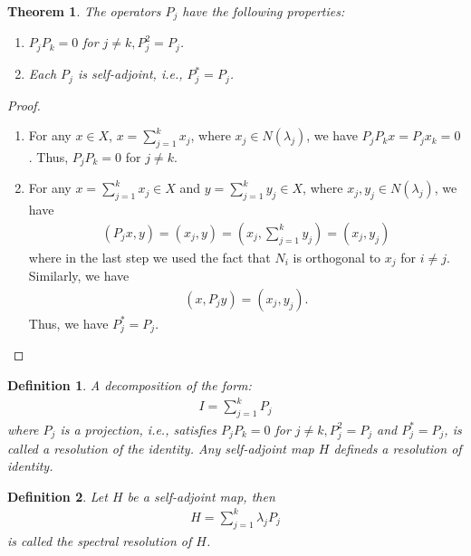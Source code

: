 \documentclass[11pt]{book}
\newtheorem{definition}{Definition}[section]
\newtheorem{theorem}{Theorem}[section]
\theoremstyle{definition}
\numberwithin{equation}{subsection}
\begin{document}
\begin{theorem}
The operators $P_j$ have the following properties:
\begin{enumerate}[label=(\roman*)]
    \item $P_j P_k = 0$ for $j\neq k, P_j^2 = P_j$.
    \item Each $P_j$ is self-adjoint, i.e., $P_j^* = P_j$.
\end{enumerate}
\end{theorem}
\begin{proof}
~\begin{enumerate}[label=(\roman*)]
    \item For any $x\in X$, $x = \sum^k_{j=1}x_j$, where $x_j\in N(\lambda_j)$, we have $P_j P_k x = P_j x_k = 0$. Thus, $P_j P_k = 0$ for $j\neq k$.
    \item For any $x = \sum^k_{j=1}x_j \in X$ and $y = \sum^k_{j=1}y_j \in X$, where $x_j, y_j \in N(\lambda_j)$, we have
    \begin{align*}
        \left(P_j x, y\right) = \left(x_j, y\right) = \left(x_j, \sum^k_{j=1}y_j\right) = \left(x_j, y_j\right)
    \end{align*}
    where in the last step we used the fact that $N_i$ is orthogonal to $x_j$ for $i\neq j$. Similarly, we have
    \begin{align*}
        \left(x, P_j y\right) = \left(x_j, y_j\right).
    \end{align*}
    Thus, we have $P_j^* = P_j$.
\end{enumerate}
\end{proof}

\medskip

\begin{definition}
A decomposition of the form:
\begin{align*}
    I = \sum^k_{j=1} P_j
\end{align*}
where $P_j$ is a projection, i.e., satisfies $P_j P_k = 0$ for $j\neq k, P_j^2 = P_j$ and $P_j^* = P_j$, is called a resolution of the identity. Any self-adjoint map $H$ defineds a resolution of identity.
\end{definition}

\medskip

\begin{definition}
Let $H$ be a self-adjoint map, then 
\begin{align*}
    H = \sum^k_{j=1} \lambda_j P_j
\end{align*}
is called the spectral resolution of $H$.
\end{definition}
\end{document}
